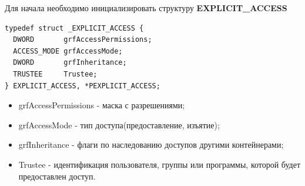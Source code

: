 Для начала необходимо инициализировать структуру \textbf{EXPLICIT\_ACCESS}\cite{EXPLICITACCESS}
\begin{lstlisting}[language={}, caption={Структура EXPLICIT\_ACCESS}]
typedef struct _EXPLICIT_ACCESS {
  DWORD       grfAccessPermissions;
  ACCESS_MODE grfAccessMode;
  DWORD       grfInheritance;
  TRUSTEE     Trustee;
} EXPLICIT_ACCESS, *PEXPLICIT_ACCESS;
\end{lstlisting}
\begin{itemize}
\item grfAccessPermissions - маска с разрешениями;
\item grfAccessMode - тип доступа(предоставление, изъятие);
\item grfInheritance - флаги по наследованию доступов другими контейнерами;
\item Trustee\cite{TRUSTEE} - идентификация пользователя, группы или программы, которой будет предоставлен доступ.
\end{itemize}

